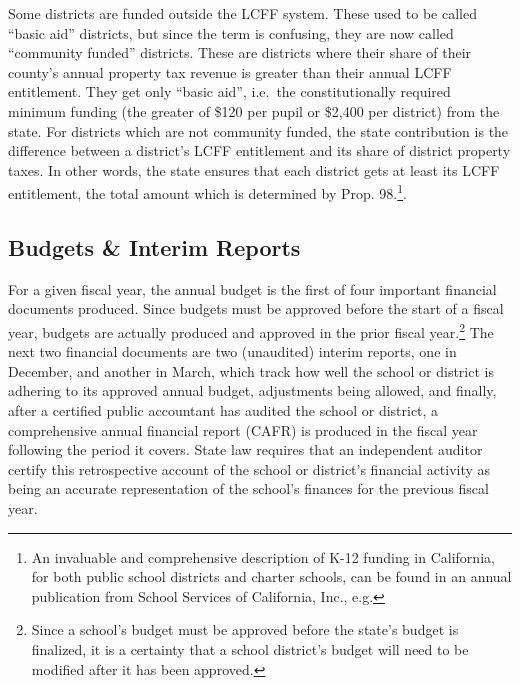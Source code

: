 Some districts are funded outside the LCFF system. These used to be called ``basic aid'' districts, but since the term is confusing, they are now called ``community funded'' districts. These are districts where their share of their county's annual property tax revenue is greater than their annual LCFF entitlement. They get only ``basic aid'', i.e.~the constitutionally required minimum funding (the greater of \$120 per pupil or \$2,400 per district) from the state. For districts which are not community funded, the state contribution is the difference between a district's LCFF entitlement and its share of district property taxes. In other words, the state ensures that each district gets at least its LCFF entitlement, the total amount which is determined by Prop. 98.\footnote{An invaluable and comprehensive description of K-12 funding in California, for both public school districts and charter schools, can be found in an annual publication from School Services of California, Inc., e.g. }.

\subsection{Budgets \& Interim Reports}\label{sec:budgets}%

For a given fiscal year, the annual budget is the first of four important financial documents produced. Since budgets must be approved before the start of a fiscal year, budgets are actually produced and approved in the prior fiscal year.\footnote{Since a school's budget must be approved before the state's budget is finalized, it is a certainty that a school district's budget will need to be modified after it has been approved.} The next two financial documents are two (unaudited) interim reports, one in December, and another in March, which track how well the school or district is adhering to its approved annual budget, adjustments being allowed, and finally, after a certified public accountant has audited the school or district, a comprehensive annual financial report (CAFR) is produced in the fiscal year following the period it covers. State law requires that an independent auditor certify this retrospective account of the school or district's financial activity as being an accurate representation of the school's finances for the previous fiscal year.

